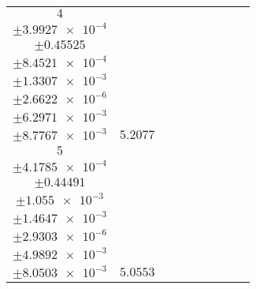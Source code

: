 \documentclass[8pt]{article}
\begin{document}
\begin{longtable}[l]{c c c c c c c c c}
$\num{4}$ & \begin{tabular}[c]{@{}c@{}}$\num{5.9911e-2}$ \\ $\pm\num{3.9927e-4}$\end{tabular} & \begin{tabular}[c]{@{}c@{}}$\num{0.13527}$ \\ $\pm\num{0.45525}$\end{tabular} & \begin{tabular}[c]{@{}c@{}}$\num{2.1409}$ \\ $\pm\num{8.4521e-4}$\end{tabular} & \begin{tabular}[c]{@{}c@{}}$\num{946.75}$ \\ $\pm\num{1.3307e-3}$\end{tabular} & \begin{tabular}[c]{@{}c@{}}$\num{1.894}$ \\ $\pm\num{2.6622e-6}$\end{tabular} & \begin{tabular}[c]{@{}c@{}}$\num{1.1627}$ \\ $\pm\num{6.2971e-3}$\end{tabular} & \begin{tabular}[c]{@{}c@{}}$\num{4.1917}$ \\ $\pm\num{8.7767e-3}$\end{tabular} & $\num{5.2077}$\\
$\num{5}$ & \begin{tabular}[c]{@{}c@{}}$\num{5.899e-2}$ \\ $\pm\num{4.1785e-4}$\end{tabular} & \begin{tabular}[c]{@{}c@{}}$\num{9.4644e-2}$ \\ $\pm\num{0.44491}$\end{tabular} & \begin{tabular}[c]{@{}c@{}}$\num{2.4397}$ \\ $\pm\num{1.055e-3}$\end{tabular} & \begin{tabular}[c]{@{}c@{}}$\num{947}$ \\ $\pm\num{1.4647e-3}$\end{tabular} & \begin{tabular}[c]{@{}c@{}}$\num{1.8945}$ \\ $\pm\num{2.9303e-6}$\end{tabular} & \begin{tabular}[c]{@{}c@{}}$\num{1.156}$ \\ $\pm\num{4.9892e-3}$\end{tabular} & \begin{tabular}[c]{@{}c@{}}$\num{4.1572}$ \\ $\pm\num{8.0503e-3}$\end{tabular} & $\num{5.0553}$\\

\end{longtable}
\end{document}

